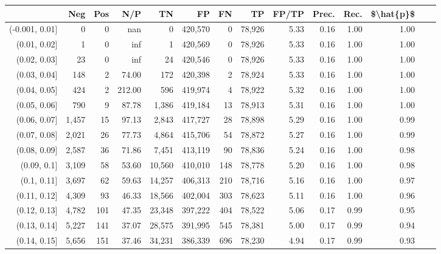 \begin{tabular}{rrrrrrrrrrrrrr}
\toprule
{} &    Neg &    Pos &     N/P &       TN &       FP &      FN &      TP & FP/TP & Prec. &  Rec. & \$\textbackslash hat\{p\}\$ \\
\midrule
(-0.001, 0.01] &      0 &      0 &     nan &        0 &  420,570 &       0 &  78,926 &  5.33 &  0.16 &  1.00 &      1.00 \\
(0.01, 0.02]   &      1 &      0 &     inf &        1 &  420,569 &       0 &  78,926 &  5.33 &  0.16 &  1.00 &      1.00 \\
(0.02, 0.03]   &     23 &      0 &     inf &       24 &  420,546 &       0 &  78,926 &  5.33 &  0.16 &  1.00 &      1.00 \\
(0.03, 0.04]   &    148 &      2 &   74.00 &      172 &  420,398 &       2 &  78,924 &  5.33 &  0.16 &  1.00 &      1.00 \\
(0.04, 0.05]   &    424 &      2 &  212.00 &      596 &  419,974 &       4 &  78,922 &  5.32 &  0.16 &  1.00 &      1.00 \\
(0.05, 0.06]   &    790 &      9 &   87.78 &    1,386 &  419,184 &      13 &  78,913 &  5.31 &  0.16 &  1.00 &      1.00 \\
(0.06, 0.07]   &  1,457 &     15 &   97.13 &    2,843 &  417,727 &      28 &  78,898 &  5.29 &  0.16 &  1.00 &      0.99 \\
(0.07, 0.08]   &  2,021 &     26 &   77.73 &    4,864 &  415,706 &      54 &  78,872 &  5.27 &  0.16 &  1.00 &      0.99 \\
(0.08, 0.09]   &  2,587 &     36 &   71.86 &    7,451 &  413,119 &      90 &  78,836 &  5.24 &  0.16 &  1.00 &      0.98 \\
(0.09, 0.1]    &  3,109 &     58 &   53.60 &   10,560 &  410,010 &     148 &  78,778 &  5.20 &  0.16 &  1.00 &      0.98 \\
(0.1, 0.11]    &  3,697 &     62 &   59.63 &   14,257 &  406,313 &     210 &  78,716 &  5.16 &  0.16 &  1.00 &      0.97 \\
(0.11, 0.12]   &  4,309 &     93 &   46.33 &   18,566 &  402,004 &     303 &  78,623 &  5.11 &  0.16 &  1.00 &      0.96 \\
(0.12, 0.13]   &  4,782 &    101 &   47.35 &   23,348 &  397,222 &     404 &  78,522 &  5.06 &  0.17 &  0.99 &      0.95 \\
(0.13, 0.14]   &  5,227 &    141 &   37.07 &   28,575 &  391,995 &     545 &  78,381 &  5.00 &  0.17 &  0.99 &      0.94 \\
(0.14, 0.15]   &  5,656 &    151 &   37.46 &   34,231 &  386,339 &     696 &  78,230 &  4.94 &  0.17 &  0.99 &      0.93 \\

\end{tabular}
